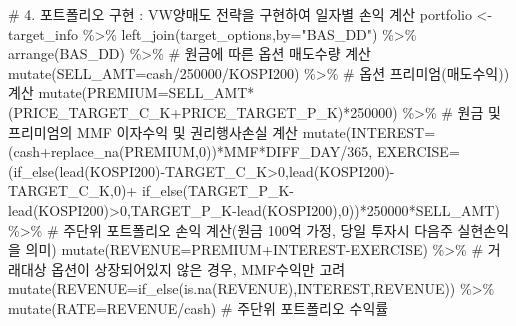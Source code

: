 \documentclass[
  a4paper,
  DIV=11,
  numbers=noendperiod]{scrreprt}
\newenvironment{Shaded}{\begin{snugshade}}{\end{snugshade}}
\newcommand{\AttributeTok}[1]{\textcolor[rgb]{0.40,0.45,0.13}{#1}}
\newcommand{\CommentTok}[1]{\textcolor[rgb]{0.37,0.37,0.37}{#1}}
\newcommand{\DecValTok}[1]{\textcolor[rgb]{0.68,0.00,0.00}{#1}}
\newcommand{\FunctionTok}[1]{\textcolor[rgb]{0.28,0.35,0.67}{#1}}
\newcommand{\NormalTok}[1]{\textcolor[rgb]{0.00,0.23,0.31}{#1}}
\newcommand{\OtherTok}[1]{\textcolor[rgb]{0.00,0.23,0.31}{#1}}
\newcommand{\SpecialCharTok}[1]{\textcolor[rgb]{0.37,0.37,0.37}{#1}}
\newcommand{\StringTok}[1]{\textcolor[rgb]{0.13,0.47,0.30}{#1}}
\begin{document}
\begin{Shaded}
\begin{Highlighting}[]
\CommentTok{\# 4. 포트폴리오 구현 : VW양매도 전략을 구현하여 일자별 손익 계산}
\NormalTok{portfolio }\OtherTok{\textless{}{-}}\NormalTok{ target\_info }\SpecialCharTok{\%\textgreater{}\%} 
  \FunctionTok{left\_join}\NormalTok{(target\_options,}\AttributeTok{by=}\StringTok{"BAS\_DD"}\NormalTok{) }\SpecialCharTok{\%\textgreater{}\%} 
  \FunctionTok{arrange}\NormalTok{(BAS\_DD) }\SpecialCharTok{\%\textgreater{}\%} 
  \CommentTok{\# 원금에 따른 옵션 매도수량 계산}
  \FunctionTok{mutate}\NormalTok{(}\AttributeTok{SELL\_AMT=}\NormalTok{cash}\SpecialCharTok{/}\DecValTok{250000}\SpecialCharTok{/}\NormalTok{KOSPI200) }\SpecialCharTok{\%\textgreater{}\%} 
  \CommentTok{\# 옵션 프리미엄(매도수익)) 계산}
  \FunctionTok{mutate}\NormalTok{(}\AttributeTok{PREMIUM=}\NormalTok{SELL\_AMT}\SpecialCharTok{*}\NormalTok{(PRICE\_TARGET\_C\_K}\SpecialCharTok{+}\NormalTok{PRICE\_TARGET\_P\_K)}\SpecialCharTok{*}\DecValTok{250000}\NormalTok{) }\SpecialCharTok{\%\textgreater{}\%} 
  \CommentTok{\# 원금 및 프리미엄의 MMF 이자수익 및 권리행사손실 계산}
  \FunctionTok{mutate}\NormalTok{(}\AttributeTok{INTEREST=}\NormalTok{(cash}\SpecialCharTok{+}\FunctionTok{replace\_na}\NormalTok{(PREMIUM,}\DecValTok{0}\NormalTok{))}\SpecialCharTok{*}\NormalTok{MMF}\SpecialCharTok{*}\NormalTok{DIFF\_DAY}\SpecialCharTok{/}\DecValTok{365}\NormalTok{,}
         \AttributeTok{EXERCISE=}\NormalTok{(}\FunctionTok{if\_else}\NormalTok{(}\FunctionTok{lead}\NormalTok{(KOSPI200)}\SpecialCharTok{{-}}\NormalTok{TARGET\_C\_K}\SpecialCharTok{\textgreater{}}\DecValTok{0}\NormalTok{,}\FunctionTok{lead}\NormalTok{(KOSPI200)}\SpecialCharTok{{-}}\NormalTok{TARGET\_C\_K,}\DecValTok{0}\NormalTok{)}\SpecialCharTok{+}
                     \FunctionTok{if\_else}\NormalTok{(TARGET\_P\_K}\SpecialCharTok{{-}}\FunctionTok{lead}\NormalTok{(KOSPI200)}\SpecialCharTok{\textgreater{}}\DecValTok{0}\NormalTok{,TARGET\_P\_K}\SpecialCharTok{{-}}\FunctionTok{lead}\NormalTok{(KOSPI200),}\DecValTok{0}\NormalTok{))}\SpecialCharTok{*}\DecValTok{250000}\SpecialCharTok{*}\NormalTok{SELL\_AMT) }\SpecialCharTok{\%\textgreater{}\%} 
  \CommentTok{\# 주단위 포트폴리오 손익 계산(원금 100억 가정, 당일 투자시 다음주 실현손익을 의미)}
  \FunctionTok{mutate}\NormalTok{(}\AttributeTok{REVENUE=}\NormalTok{PREMIUM}\SpecialCharTok{+}\NormalTok{INTEREST}\SpecialCharTok{{-}}\NormalTok{EXERCISE) }\SpecialCharTok{\%\textgreater{}\%} 
  \CommentTok{\# 거래대상 옵션이 상장되어있지 않은 경우, MMF수익만 고려}
  \FunctionTok{mutate}\NormalTok{(}\AttributeTok{REVENUE=}\FunctionTok{if\_else}\NormalTok{(}\FunctionTok{is.na}\NormalTok{(REVENUE),INTEREST,REVENUE)) }\SpecialCharTok{\%\textgreater{}\%} 
  \FunctionTok{mutate}\NormalTok{(}\AttributeTok{RATE=}\NormalTok{REVENUE}\SpecialCharTok{/}\NormalTok{cash)  }\CommentTok{\# 주단위 포트폴리오 수익률}


\end{Highlighting}
\end{Shaded}
\end{document}
